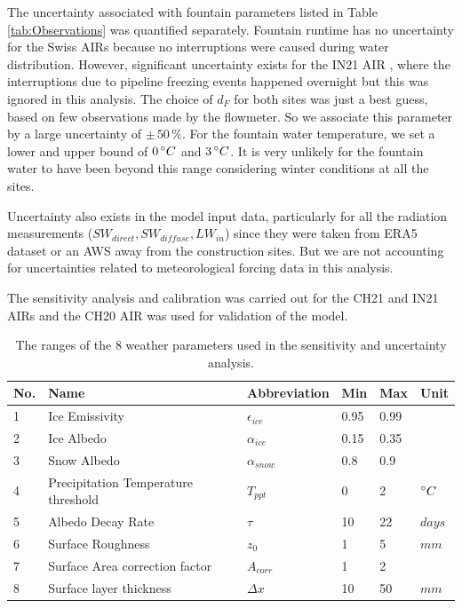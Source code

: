 \documentclass[utf8]{frontiersSCNS}
\begin{document}
The uncertainty associated with fountain parameters listed in Table \ref{tab:Observations} was quantified
separately. Fountain runtime has no uncertainty for the Swiss AIRs because no interruptions were caused during
water distribution. However, significant uncertainty exists for the IN21 AIR , where the interruptions due to
pipeline freezing events happened overnight but this was ignored in this analysis. The choice of $d_F$ for both
sites was just a best guess, based on few observations made by the flowmeter. So we associate this parameter by a
large uncertainty of $\pm \,50\, \%$. For the fountain water temperature, we set a lower and upper bound of $0\,
	\degree C$ and $3\, \degree C$.  It is very unlikely for the fountain water to have been beyond this range
considering winter conditions at all the sites.

Uncertainty also exists in the model input data, particularly for all the radiation measurements ($SW_{direct},
	SW_{diffuse}, LW_{in}$) since they were taken from ERA5 dataset or an AWS away from the construction sites.  But we are
not accounting for uncertainties related to meteorological forcing data in this analysis.

The sensitivity analysis and calibration was carried out for the CH21 and IN21 AIRs and the CH20 AIR was used for
validation of the model.

\begin{table}
	\centering
	\caption{The ranges of the 8 weather parameters used in the sensitivity and uncertainty analysis.}
	\label{tab:parameters}
	\begin{tabular}{@{}llllll@{}}
		\toprule
		\textbf{No.} & \textbf{Name}                       & \textbf{Abbreviation} & \textbf{Min} & \textbf{Max} & \textbf{Unit} \\\midrule
		1            & Ice Emissivity                      & $\epsilon_{ice}$      & 0.95         & 0.99         &               \\
		2            & Ice Albedo                          & $\alpha_{ice}$        & 0.15         & 0.35         &               \\
		3            & Snow Albedo                         & $\alpha_{snow}$       & 0.8          & 0.9          &               \\
		4            & Precipitation Temperature threshold & $T_{ppt}$             & 0            & 2            & $\degree C$   \\
		5            & Albedo Decay Rate                   & $\tau$                & 10           & 22           & $days$        \\
		6            & Surface Roughness                   & $z_0$                 & 1            & 5            & $mm$          \\
		7            & Surface Area correction factor      & $A_{corr}$            & 1            & 2            &               \\
		8            & Surface layer thickness             & $\Delta x$            & 10           & 50           & $mm$          \\\bottomrule
	\end{tabular}
\end{table}
\end{document}
